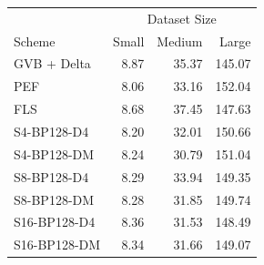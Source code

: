 \begin{tabular}{lrrr}
\toprule
 & \multicolumn{3}{c}{Dataset Size} \\
Scheme & Small & Medium & Large \\
\midrule
GVB + Delta & 8.87 & 35.37 & 145.07 \\
PEF & 8.06 & 33.16 & 152.04 \\
FLS & 8.68 & 37.45 & 147.63 \\
S4-BP128-D4 & 8.20 & 32.01 & 150.66 \\
S4-BP128-DM & 8.24 & 30.79 & 151.04 \\
S8-BP128-D4 & 8.29 & 33.94 & 149.35 \\
S8-BP128-DM & 8.28 & 31.85 & 149.74 \\
S16-BP128-D4 & 8.36 & 31.53 & 148.49 \\
S16-BP128-DM & 8.34 & 31.66 & 149.07 \\
\bottomrule
\end{tabular}

